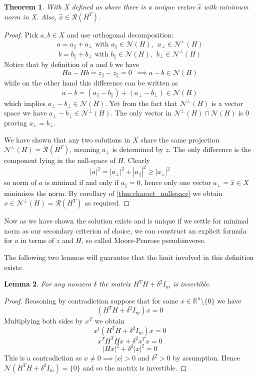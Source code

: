 \documentclass[a4paper,11pt]{article}
\theoremstyle{break}
\newtheorem{theorem}{Theorem}[section]
\newtheorem{lemma}[theorem]{Lemma}
\newcommand{\R}{\mathbb{R}}
\newcommand{\Nu}{\mathcal{N}}
\newcommand{\Ra}{\mathcal{R}}
\newcommand{\pll}{\parallel}
\begin{document}
\begin{theorem}\label{thm:regression_uniqueness}
    With X defined as above there is a unique vector $\hat{x}$ with minimum norm in X.
    Also, $\hat{x} \in \Ra(H^T)$.
\end{theorem}
\begin{proof}
    Pick $a, b \in X$ and use orthogonal decomposition:
    $$ a = a_\pll + a_\perp \text{ with } a_\pll \in \Nu(H),~~ a_\perp \in \Nu^\perp (H)$$
    $$ b = b_\pll + b_\perp \text{ with } b_\pll \in \Nu(H),~~ b_\perp \in \Nu^\perp (H)$$
    Notice that by definition of $a$ and $b$ we have
    $$ H a - H b = z_\pll - z_\pll = 0 ~~ \implies a - b \in \Nu(H)$$
    while on the other hand this difference can be written as
    $$ a - b = (a_\pll - b_\pll) + (a_\perp - b_\perp) \in \Nu(H)$$
    which implies $ a_\perp - b_\perp \in \Nu(H) $. Yet from the fact that $\Nu^\perp (H)$ is a vector space we have $ a_\perp - b_\perp \in \Nu^\perp (H)$. The only vector in $ \Nu^\perp (H) \cap \Nu (H)$ is $0$ proving $ a_\perp = b_\perp$.
    
    We have shown that any two solutions in $X$ share the same projection $\Nu^\perp (H) = \Ra(H^T)$, meaning $a_\perp$ is determined by $z$.
    The only difference is the component lying in the null-space of $H$. Clearly
    $$ | a |^2 = | a_\perp |^2 + |a_\pll |^2 \geq |a_\perp |^2$$
    so norm of $a$ is minimal if and only if $a_\pll = 0$, hence only one vector $a_\perp = \hat{x} \in X$ minimises the norm.
    By corollary of \ref{thm:charact_nullspace} we obtain $ \hat{x} \in \Nu^\perp (H) = \Ra(H^T) $ as required.
\end{proof}
Now as we have shown the solution exists and is unique if we settle for minimal norm as our secondary criterion of choice, we can construct an explicit formula for $a$ in terms of $z$ and $H$, so called Moore-Penrose pseudoinverse.


The following two lemmas will guarantee that the limit involved in this definition exists:

\begin{lemma}\label{lem:invertible_1}
    For any nonzero $\delta$ the matrix $H^T H + \delta^2  I_m$ is invertible.
    \label{thm:invertible}
\end{lemma}
\begin{proof}
    Reasoning by contradiction suppose that for some $x \in \R^n \setminus \{0\}$ we have
    $$ (H^T H + \delta^2  I_m) x = 0 $$ %
Multiplying both sides by $x^T$ we obtain
    $$ x^t (H^T H + \delta^2  I_m) x = 0 $$ %
    $$ x^T H^T H x + \delta^2 x^T x = 0 $$
    $$ | H x |^2 + \delta^2 | x |^2 = 0 $$
This is a contradiction as $ x \neq 0 \implies | x | > 0 $ and $ \delta^2 > 0$ by assumption.
Hence $\Nu(H^T H + \delta^2  I_m) = \{0\} $ and so the matrix is invertible.
\end{proof}
\end{document}
